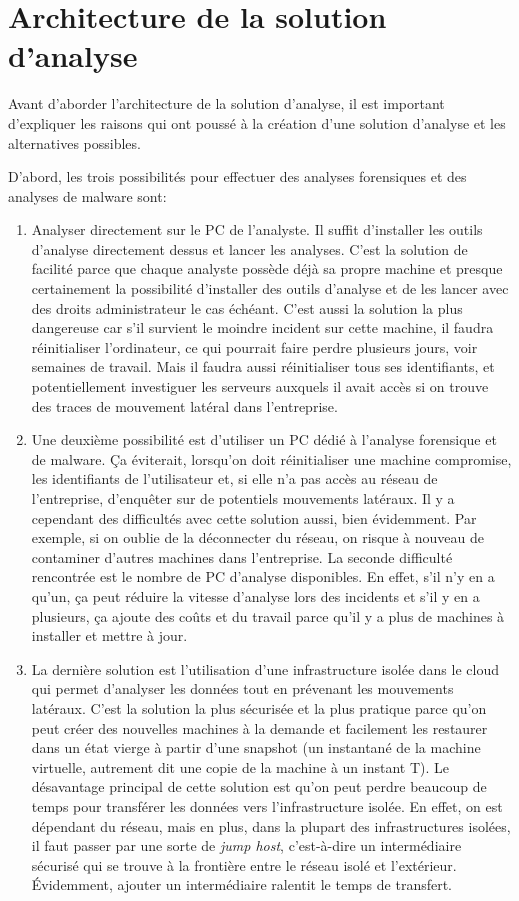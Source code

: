 
\chapter{Architecture de la solution d'analyse}

Avant d'aborder l'architecture de la solution d'analyse, il est important d'expliquer les raisons qui ont poussé à la création d'une solution d'analyse et les alternatives possibles.

D'abord, les trois possibilités pour effectuer des analyses forensiques et des analyses de malware sont:
\begin{enumerate}
    \item Analyser directement sur le PC de l'analyste. Il suffit d'installer les outils d'analyse directement dessus et lancer les analyses. C'est la solution de facilité parce que chaque analyste possède déjà sa propre machine et presque certainement la possibilité d'installer des outils d'analyse et de les lancer avec des droits administrateur le cas échéant. C'est aussi la solution la plus dangereuse car s'il survient le moindre incident sur cette machine, il faudra réinitialiser l'ordinateur, ce qui pourrait faire perdre plusieurs jours, voir semaines de travail. Mais il faudra aussi réinitialiser tous ses identifiants, et potentiellement investiguer les serveurs auxquels il avait accès si on trouve des traces de mouvement latéral dans l'entreprise.
    \item Une deuxième possibilité est d'utiliser un PC dédié à l'analyse forensique et de malware. Ça éviterait, lorsqu'on doit réinitialiser une machine compromise, les identifiants de l'utilisateur et, si elle n'a pas accès au réseau de l'entreprise, d'enquêter sur de potentiels mouvements latéraux. Il y a cependant des difficultés avec cette solution aussi, bien évidemment. Par exemple, si on oublie de la déconnecter du réseau, on risque à nouveau de contaminer d'autres machines dans l'entreprise. La seconde difficulté rencontrée est le nombre de PC d'analyse disponibles. En effet, s'il n'y en a qu'un, ça peut réduire la vitesse d'analyse lors des incidents et s'il y en a plusieurs, ça ajoute des coûts et du travail parce qu'il y a plus de machines à installer et mettre à jour.
    \item La dernière solution est l'utilisation d'une infrastructure isolée dans le cloud qui permet d'analyser les données tout en prévenant les mouvements latéraux. C'est la solution la plus sécurisée et la plus pratique parce qu'on peut créer des nouvelles machines à la demande et facilement les restaurer dans un état vierge à partir d'une snapshot (un instantané de la machine virtuelle, autrement dit une copie de la machine à un instant T). Le désavantage principal de cette solution est qu'on peut perdre beaucoup de temps pour transférer les données vers l'infrastructure isolée. En effet, on est dépendant du réseau, mais en plus, dans la plupart des infrastructures isolées, il faut passer par une sorte de \textit{jump host}, c'est-à-dire un intermédiaire sécurisé qui se trouve à la frontière entre le réseau isolé et l'extérieur. Évidemment, ajouter un intermédiaire ralentit le temps de transfert.
\end{enumerate}

